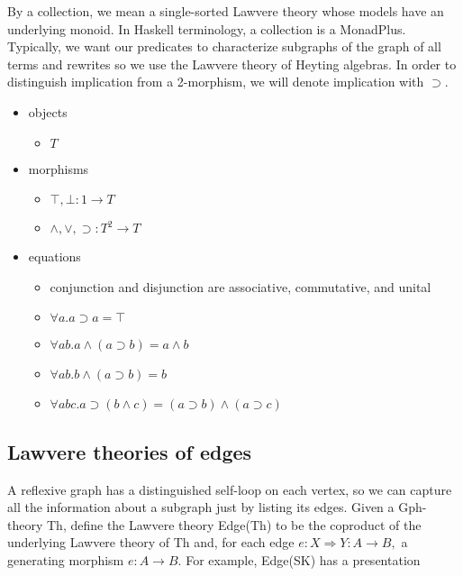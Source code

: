 \documentclass[submission,copyright,creativecommons]{eptcs}
\newcommand{\maps}{\colon}
\begin{document}
By a collection, we mean a single-sorted Lawvere theory whose models have an underlying monoid.  In Haskell terminology, a collection is a MonadPlus.  Typically, we want our predicates to characterize subgraphs of the graph of all terms and rewrites so we use the Lawvere theory of Heyting algebras.  In order to distinguish implication from a 2-morphism, we will denote implication with $\supset.$
\begin{itemize}
  \item objects
    \begin{itemize}
      \item $T$
    \end{itemize}
  \item morphisms
    \begin{itemize}
      \item $\top, \bot\maps 1 \to T$
      \item $\land, \lor, \supset\maps T^2 \to T$
    \end{itemize}
  \item equations
    \begin{itemize}
      \item conjunction and disjunction are associative, commutative, and unital
      \item $\forall a.a \supset a = \top$
      \item $\forall ab.a \land (a \supset b) = a \land b$
      \item $\forall ab.b \land (a \supset b) = b$
      \item $\forall abc.a \supset (b \land c) = (a \supset b) \land (a \supset c)$
    \end{itemize}
\end{itemize}

\subsection{Lawvere theories of edges}

A reflexive graph has a distinguished self-loop on each vertex, so we can capture all the information about a subgraph just by listing its edges.  Given a Gph-theory Th, define the Lawvere theory Edge(Th) to be the coproduct of the underlying Lawvere theory of Th and, for each edge $e\maps X \Rightarrow Y \maps A \to B,$ a generating morphism $e\maps A \to B.$  For example, Edge(SK) has a presentation
\end{document}
